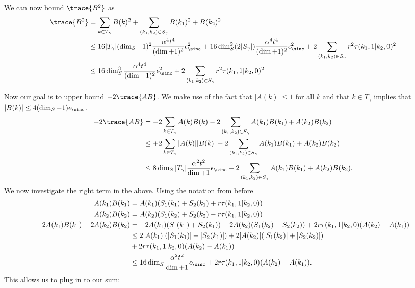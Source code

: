     We can now bound $\trace{B^2}$ as
    \begin{align}
        \trace{B^2} &= \sum_{k \in T_{\gamma}} B(k)^2 + \sum_{(k_1, k_2) \in S_{\gamma}} B(k_1)^2 + B(k_2)^2 \\
        &\leq 16 |T_{\gamma}| (\dim_S - 1)^2 \frac{\alpha^4 t^4}{(\dim + 1)^2} \epsilon_{\sinc}^2 + 16 \dim_S^2 (2 |S_{\gamma}|) \frac{\alpha^4 t^4}{(\dim + 1)^2} \epsilon_{\sinc}^2 + 2 \sum_{(k_1, k_2) \in S_{\gamma}} r^2 \tau(k_1, 1 | k_2, 0)^2 \\
        &\leq 16 \dim_S^3 \frac{\alpha^4 t^4}{(\dim + 1)^2} \epsilon_{\sinc}^2 + 2 \sum_{(k_1, k_2) \in S_{\gamma}} r^2 \tau(k_1, 1 | k_2, 0)^2
    \end{align}
    
    Now our goal is to upper bound $-2\trace{AB}$. We make use of the fact that $|A(k)| \leq 1$ for all $k$ and that $k \in T_{\gamma}$ implies that $|B(k)| \leq 4 (\dim_S - 1) \epsilon_{\sinc}$.
    \begin{align}
        -2 \trace{AB} &= -2 \sum_{k \in T_{\gamma}} A(k) B(k) - 2 \sum_{(k_1, k_2) \in S_{\gamma}} A(k_1) B(k_1) + A(k_2) B(k_2) \\
        &\leq + 2 \sum_{k \in T_{\gamma}} |A(k)| |B(k)| - 2 \sum_{(k_1, k_2) \in S_{\gamma}} A(k_1) B(k_1) + A(k_2) B(k_2) \\
        &\leq 8 \dim_S |T_{\gamma}| \frac{\alpha^2 t^2}{\dim + 1} \epsilon_{\sinc} - 2 \sum_{(k_1, k_2) \in S_{\gamma}} A(k_1) B(k_1) + A(k_2) B(k_2).
    \end{align}
    We now investigate the right term in the above. Using the notation from before
    \begin{align}
        A(k_1) B(k_1) &= A(k_1) (S_1(k_1) + S_2(k_1) + r \tau(k_1, 1 | k_2, 0)) \\
        A(k_2) B(k_2) &= A(k_2) (S_1(k_2) + S_2(k_2) - r \tau(k_1, 1 | k_2, 0)) \\
        -2A(k_1) B(k_1) -2 A(k_2) B(k_2) & = -2 A(k_1)(S_1(k_1) + S_2(k_1))  - 2A(k_2)( S_1(k_2) + S_2(k_2)) + 2 r \tau(k_1, 1 | k_2, 0)( A(k_2) - A(k_1)) \\
        &\leq 2 |A(k_1)|(|S_1(k_1)| + |S_2(k_1)|) + 2 |A(k_2)|( |S_1(k_2)| + |S_2(k_2)|) \nonumber \\
        &+ 2 r \tau(k_1, 1 | k_2, 0)(A(k_2) - A(k_1)) \\
        &\leq 16 \dim_S \frac{\alpha^2 t^2}{\dim + 1} \epsilon_{\sinc} + 2 r \tau(k_1, 1 | k_2, 0)( A(k_2) - A(k_1)).
    \end{align}
    This allows us to plug in to our sum:
